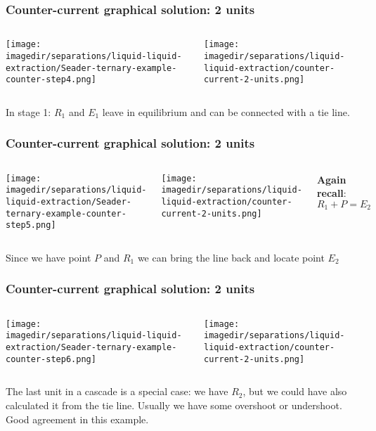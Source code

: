 \begin{frame}\frametitle{Counter-current graphical solution: 2 units}
	\begin{columns}[t]
			\begin{center}
				\texttt{[image: \\imagedir/separations/liquid-liquid-extraction/Seader-ternary-example-counter-step4.png]}
			\end{center}
			\begin{center}
				\texttt{[image: \\imagedir/separations/liquid-liquid-extraction/counter-current-2-units.png]}
			\end{center}
	\end{columns}
	\vspace{12pt}
	In stage 1: $R_1$ and $E_1$ leave in equilibrium and can be connected with a tie line.
	\vfill
\end{frame}

\begin{frame}\frametitle{Counter-current graphical solution: 2 units}
	\begin{columns}[t]
			\begin{center}
				\texttt{[image: \\imagedir/separations/liquid-liquid-extraction/Seader-ternary-example-counter-step5.png]}
			\end{center}
			\begin{center}
				\texttt{[image: \\imagedir/separations/liquid-liquid-extraction/counter-current-2-units.png]}
			\end{center}
			\textbf{Again recall}: 
			\vspace{-12pt}
			\[	R_1 + P = E_2 \]
	\end{columns}
	\vspace{12pt}
	Since we have point $P$ and $R_1$ we can bring the line back and locate point $E_2$
	\vfill
\end{frame}

\begin{frame}\frametitle{Counter-current graphical solution: 2 units}
	\begin{columns}[t]
			\begin{center}
				\texttt{[image: \\imagedir/separations/liquid-liquid-extraction/Seader-ternary-example-counter-step6.png]}
			\end{center}
			\begin{center}
				\texttt{[image: \\imagedir/separations/liquid-liquid-extraction/counter-current-2-units.png]}
			\end{center}
	\end{columns}
	\vspace{12pt}
	The last unit in a cascade is a special case: we have $R_2$, but we could have also calculated it from the tie line. Usually we have some overshoot or undershoot. {\scriptsize Good agreement in this example.}
\end{frame}

